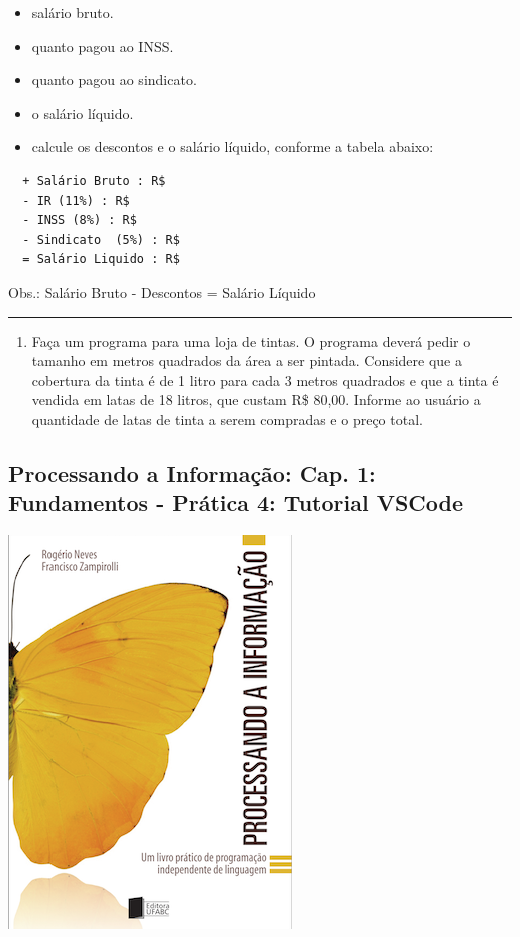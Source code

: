 \documentclass[12pt,a4paper]{article}
\providecommand{\tightlist}{%
      \setlength{\itemsep}{0pt}\setlength{\parskip}{0pt}}
\begin{document}
\begin{itemize}
\tightlist
\item
  salário bruto.
\item
  quanto pagou ao INSS.
\item
  quanto pagou ao sindicato.
\item
  o salário líquido.
\item
  calcule os descontos e o salário líquido, conforme a tabela abaixo:
\end{itemize}

\begin{verbatim}
  + Salário Bruto : R$
  - IR (11%) : R$
  - INSS (8%) : R$
  - Sindicato  (5%) : R$
  = Salário Liquido : R$
\end{verbatim}

Obs.: Salário Bruto - Descontos = Salário Líquido

    \begin{center}\rule{0.5\linewidth}{0.5pt}\end{center}

\begin{enumerate}
\def\labelenumi{\arabic{enumi}.}
\setcounter{enumi}{9}
\tightlist
\item
  Faça um programa para uma loja de tintas. O programa deverá pedir o
  tamanho em metros quadrados da área a ser pintada. Considere que a
  cobertura da tinta é de 1 litro para cada 3 metros quadrados e que a
  tinta é vendida em latas de 18 litros, que custam R\$ 80,00. Informe
  ao usuário a quantidade de latas de tinta a serem compradas e o preço
  total.
\end{enumerate}

    \hypertarget{processando-a-informauxe7uxe3o-cap.-1-fundamentos---pruxe1tica-4-tutorial-vscode}{%
\subsection{Processando a Informação: Cap. 1: Fundamentos - Prática 4:
Tutorial
VSCode}\label{processando-a-informauxe7uxe3o-cap.-1-fundamentos---pruxe1tica-4-tutorial-vscode}}

    \includegraphics{"figs/Capa_Processando_Informacao.jpg"}
\end{document}
